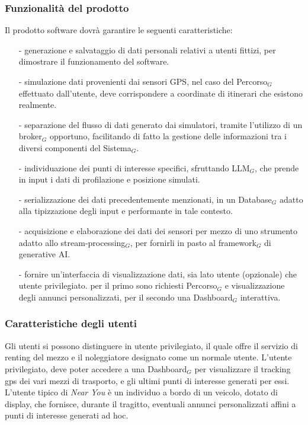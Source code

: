 \documentclass[10pt]{article}
\begin{document}
\begin{justify}
\subsubsection{Funzionalità del prodotto}
Il prodotto software dovrà garantire le seguenti caratteristiche:
\begin{itemize}
    \item [-] generazione e salvataggio di dati personali relativi a utenti fittizi, per dimostrare il funzionamento del software.
    \item [-] simulazione dati provenienti dai sensori GPS, nel caso del Percorso$_G$ effettuato dall'utente, deve corrispondere a coordinate di itinerari che esistono realmente.
    \item [-] separazione del flusso di dati generato dai simulatori, tramite l'utilizzo di un broker$_G$ opportuno, facilitando di fatto la gestione delle informazioni tra i diversi componenti del Sistema$_G$.
    \item [-] individuazione dei punti di interesse specifici, sfruttando LLM$_G$, che prende in input i dati di profilazione e posizione simulati.
    \item [-] serializzazione dei dati precedentemente menzionati, in un Database$_G$ adatto alla tipizzazione degli input e performante in tale contesto.
    \item [-] acquisizione e elaborazione dei dati dei sensori per mezzo di uno strumento adatto allo stream-processing$_G$, per fornirli in pasto al framework$_G$ di generative AI.
    \item [-] fornire un'interfaccia di visualizzazione dati, sia lato utente (opzionale) che utente privilegiato. per il primo sono richiesti Percorso$_G$ e visualizzazione degli annunci personalizzati, per il secondo una Dashboard$_G$ interattiva.
\end{itemize}

\subsubsection{Caratteristiche degli utenti}
Gli utenti si possono distinguere in utente privilegiato, il quale offre il servizio di renting del mezzo e il noleggiatore designato come un normale utente. L'utente privilegiato, deve poter accedere a una Dashboard$_G$ per visualizzare il tracking gps dei vari mezzi di trasporto, e gli ultimi punti di interesse generati per essi. L'utente tipico di \textit{Near You} è un individuo a bordo di un veicolo, dotato di display, che fornisce, durante il tragitto, eventuali annunci personalizzati affini a punti di interesse generati ad hoc.


\end{justify}
\end{document}

